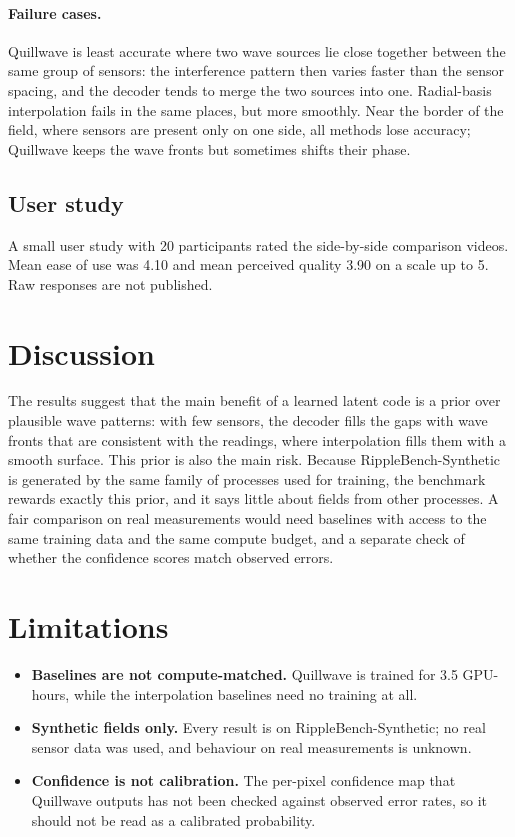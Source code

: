 \documentclass[11pt,a4paper]{article}
\begin{document}
\paragraph{Failure cases.} Quillwave is least accurate where two wave sources lie close together
between the same group of sensors: the interference pattern then varies faster than the sensor spacing,
and the decoder tends to merge the two sources into one. Radial-basis interpolation fails in the same
places, but more smoothly. Near the border of the field, where sensors are present only on one side, all
methods lose accuracy; Quillwave keeps the wave fronts but sometimes shifts their phase.
\subsection{User study}
A small user study with 20 participants rated the side-by-side comparison videos. Mean
ease of use was 4.10 and mean perceived quality 3.90 on a scale up to 5. Raw responses are not
published.

\section{Discussion}
The results suggest that the main benefit of a learned latent code is a prior over plausible wave
patterns: with few sensors, the decoder fills the gaps with wave fronts that are consistent with the
readings, where interpolation fills them with a smooth surface. This prior is also the main risk. Because
RippleBench-Synthetic is generated by the same family of processes used for training, the benchmark
rewards exactly this prior, and it says little about fields from other processes. A fair comparison on
real measurements would need baselines with access to the same training data and the same compute budget,
and a separate check of whether the confidence scores match observed errors.

\section{Limitations}\label{sec:limits}
\begin{itemize}
\item \textbf{Baselines are not compute-matched.} Quillwave is trained for 3.5 GPU-hours, while the interpolation baselines need no training at all.
\item \textbf{Synthetic fields only.} Every result is on RippleBench-Synthetic; no real sensor data was used, and behaviour on real measurements is unknown.
\item \textbf{Confidence is not calibration.} The per-pixel confidence map that Quillwave outputs has not been checked against observed error rates, so it should not be read as a calibrated probability.
\end{itemize}
\end{document}
